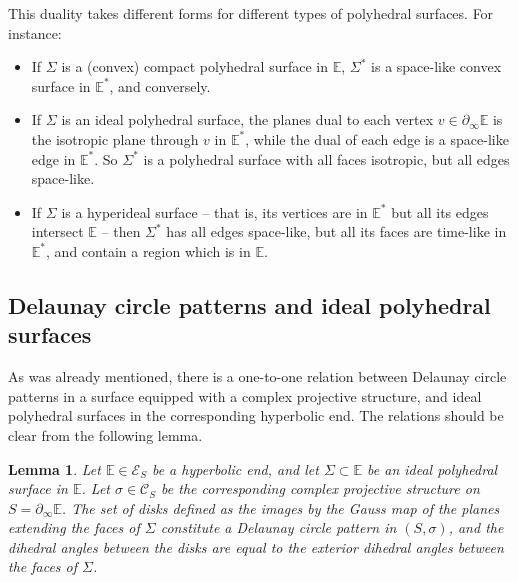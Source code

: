\documentclass[notitlepage,twoside,a4paper]{amsart}
\newtheorem{lemma}[theorem]{\rm\bf Lemma}
\newtheorem{definition}[theorem]{\rm\bf Definition}
\theoremstyle{named}
\newcommand{\cC}{{\mathcal C}}
\newcommand{\bE}{{\mathbb E}}
\newcommand{\cE}{{\mathcal E}}
\newcommand{\cP}{{\mathcal P}}
\newcommand{\cT}{{\mathcal T}}
\begin{document}
This duality takes different forms for different types of polyhedral surfaces. For instance:
\begin{itemize}
\item If $\Sigma$ is a (convex) compact polyhedral surface in $\bE$, $\Sigma^*$ is a space-like convex surface in $\bE^*$, and conversely.
\item If $\Sigma$ is an ideal polyhedral surface, the planes dual to each vertex $v\in \partial_\infty\bE$ is the isotropic plane through $v$ in $\bE^*$, while the dual of each edge is a space-like edge in $\bE^*$. So $\Sigma^*$ is a polyhedral surface with all faces isotropic, but all edges space-like.  
\item If $\Sigma$ is a hyperideal surface -- that is, its vertices are in $\bE^*$ but all its edges intersect $\bE$ -- then $\Sigma^*$ has all edges space-like, but all its faces are time-like in $\bE^*$, and contain a region which is in $\bE$.
\end{itemize}

\subsection{Delaunay circle patterns and ideal polyhedral surfaces}
\label{ssc:ideal}


As was already mentioned, there is a one-to-one relation between Delaunay circle patterns in a surface equipped with a complex projective structure, and ideal polyhedral surfaces in the corresponding hyperbolic end. The relations should be clear from the following lemma.

\begin{lemma} \label{lm:ideal}
  Let $\bE\in \cE_S$ be a hyperbolic end, and let $\Sigma\subset \bE$ be an ideal polyhedral surface in $\bE$. Let $\sigma\in \cC_S$ be the corresponding complex projective structure on $S=\partial_\infty \bE$. The set of disks defined as the images by the Gauss map of the planes extending the faces of $\Sigma$ constitute a Delaunay circle pattern in $(S,\sigma)$, and the dihedral angles between the disks are equal to the exterior dihedral angles between the faces of $\Sigma$.
\end{lemma}
\end{document}

